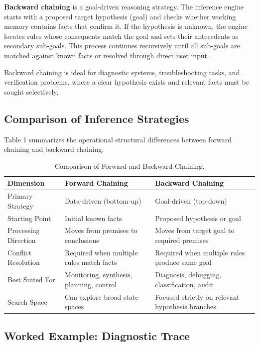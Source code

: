 \documentclass[12pt]{report}
\begin{document}
\textbf{Backward chaining} is a goal-driven reasoning strategy. The inference engine starts with a proposed target hypothesis (goal) and checks whether working memory contains facts that confirm it. If the hypothesis is unknown, the engine locates rules whose consequents match the goal and sets their antecedents as secondary sub-goals. This process continues recursively until all sub-goals are matched against known facts or resolved through direct user input.

Backward chaining is ideal for diagnostic systems, troubleshooting tasks, and verification problems, where a clear hypothesis exists and relevant facts must be sought selectively.

\subsection{Comparison of Inference Strategies}

Table 1 summarizes the operational structural differences between forward chaining and backward chaining.

\begin{table}[h]
\centering
\begin{tabularx}{\textwidth}{@{} X X X @{}}
\toprule
\textbf{Dimension} & \textbf{Forward Chaining} & \textbf{Backward Chaining} \\
\midrule
Primary Strategy & Data-driven (bottom-up) & Goal-driven (top-down) \\
Starting Point & Initial known facts & Proposed hypothesis or goal \\
Processing Direction & Moves from premises to conclusions & Moves from target goal to required premises \\
Conflict Resolution & Required when multiple rules match facts & Required when multiple rules produce same goal \\
Best Suited For & Monitoring, synthesis, planning, control & Diagnosis, debugging, classification, audit \\
Search Space & Can explore broad state spaces & Focused strictly on relevant hypothesis branches \\
\bottomrule
\end{tabularx}
\caption{Comparison of Forward and Backward Chaining.}
\end{table}

\subsection{Worked Example: Diagnostic Trace}
\end{document}
